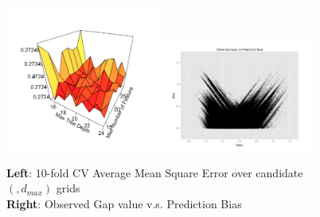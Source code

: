 \documentclass[11pt]{article}
\theoremstyle{definition}
\begin{document}
\begin{figure}[h!]
    \centering
    \includegraphics[width=0.45\textwidth]{"./plots/par_select"}
    \includegraphics[width=0.45\textwidth]{"./plots/resid"}
    \caption{\textbf{Left}: 10-fold CV Average Mean Square Error over candidate $(\bm, d_{max})$  grids\\
    \textbf{Right}: Observed Gap value v.s. Prediction Bias}
    \label{fig:par_select}
\end{figure}
\end{document}
